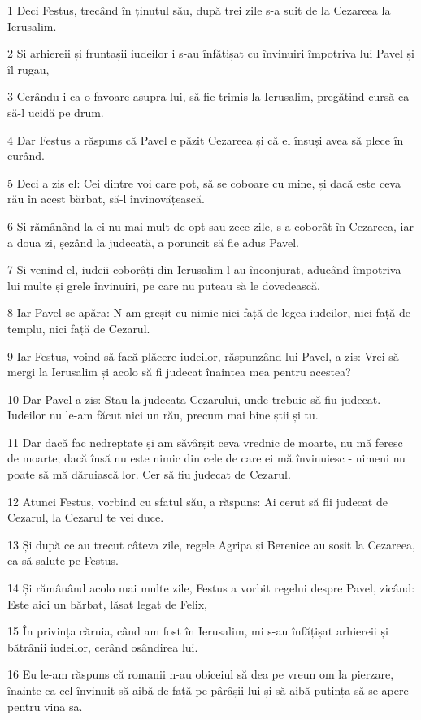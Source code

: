 \par 1 Deci Festus, trecând în ținutul său, după trei zile s-a suit de la Cezareea la Ierusalim.
\par 2 Și arhiereii și fruntașii iudeilor i s-au înfățișat cu învinuiri împotriva lui Pavel și îl rugau,
\par 3 Cerându-i ca o favoare asupra lui, să fie trimis la Ierusalim, pregătind cursă ca să-l ucidă pe drum.
\par 4 Dar Festus a răspuns că Pavel e păzit Cezareea și că el însuși avea să plece în curând.
\par 5 Deci a zis el: Cei dintre voi care pot, să se coboare cu mine, și dacă este ceva rău în acest bărbat, să-l învinovățească.
\par 6 Și rămânând la ei nu mai mult de opt sau zece zile, s-a coborât în Cezareea, iar a doua zi, șezând la judecată, a poruncit să fie adus Pavel.
\par 7 Și venind el, iudeii coborâți din Ierusalim l-au înconjurat, aducând împotriva lui multe și grele învinuiri, pe care nu puteau să le dovedească.
\par 8 Iar Pavel se apăra: N-am greșit cu nimic nici față de legea iudeilor, nici față de templu, nici față de Cezarul.
\par 9 Iar Festus, voind să facă plăcere iudeilor, răspunzând lui Pavel, a zis: Vrei să mergi la Ierusalim și acolo să fi judecat înaintea mea pentru acestea?
\par 10 Dar Pavel a zis: Stau la judecata Cezarului, unde trebuie să fiu judecat. Iudeilor nu le-am făcut nici un rău, precum mai bine știi și tu.
\par 11 Dar dacă fac nedreptate și am săvârșit ceva vrednic de moarte, nu mă feresc de moarte; dacă însă nu este nimic din cele de care ei mă învinuiesc - nimeni nu poate să mă dăruiască lor. Cer să fiu judecat de Cezarul.
\par 12 Atunci Festus, vorbind cu sfatul său, a răspuns: Ai cerut să fii judecat de Cezarul, la Cezarul te vei duce.
\par 13 Și după ce au trecut câteva zile, regele Agripa și Berenice au sosit la Cezareea, ca să salute pe Festus.
\par 14 Și rămânând acolo mai multe zile, Festus a vorbit regelui despre Pavel, zicând: Este aici un bărbat, lăsat legat de Felix,
\par 15 În privința căruia, când am fost în Ierusalim, mi s-au înfățișat arhiereii și bătrânii iudeilor, cerând osândirea lui.
\par 16 Eu le-am răspuns că romanii n-au obiceiul să dea pe vreun om la pierzare, înainte ca cel învinuit să aibă de față pe pârâșii lui și să aibă putința să se apere pentru vina sa.
